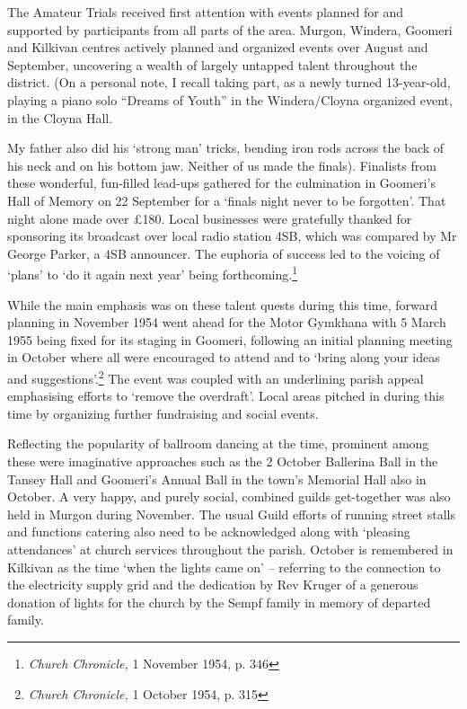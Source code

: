 The Amateur Trials received first attention with events planned for and
supported by participants from all parts of the area. Murgon, Windera,
Goomeri and Kilkivan centres actively planned and organized events over
August and September, uncovering a wealth of largely untapped talent
throughout the district. (On a personal note, I recall taking part, as a
newly turned 13-year-old, playing a piano solo ``Dreams of Youth'' in
the Windera/Cloyna organized event, in the Cloyna Hall.

My father also did his `strong man' tricks, bending iron rods across the
back of his neck and on his bottom jaw. Neither of us made the finals).
Finalists from these wonderful, fun-filled lead-ups gathered for the
culmination in Goomeri's Hall of Memory on 22 September for a `finals
night never to be forgotten'. That night alone made over \pounds180. Local
businesses were gratefully thanked for sponsoring its broadcast over
local radio station 4SB, which was compared by Mr George Parker, a 4SB
announcer. The euphoria of success led to the voicing of `plans' to `do
it again next year' being forthcoming.\footnote{\emph{Church Chronicle,}
  1 November 1954, p. 346}

While the main emphasis was on these talent quests during this time,
forward planning in November 1954 went ahead for the Motor Gymkhana with
5 March 1955 being fixed for its staging in Goomeri, following an
initial planning meeting in October where all were encouraged to attend
and to `bring along your ideas and suggestions'.\footnote{\emph{Church
  Chronicle,} 1 October 1954, p. 315} The event was coupled with an
underlining parish appeal emphasising efforts to `remove the overdraft'.
Local areas pitched in during this time by organizing further
fundraising and social events.

Reflecting the popularity of ballroom dancing at the time, prominent
among these were imaginative approaches such as the 2 October Ballerina
Ball in the Tansey Hall and Goomeri's Annual Ball in the town's Memorial
Hall also in October. A very happy, and purely social, combined guilds
get-together was also held in Murgon during November. The usual Guild
efforts of running street stalls and functions catering also need to be
acknowledged along with `pleasing attendances' at church services
throughout the parish. October is remembered in Kilkivan as the time
`when the lights came on' -- referring to the connection to the
electricity supply grid and the dedication by Rev Kruger of a generous
donation of lights for the church by the Sempf family in memory of
departed family.

